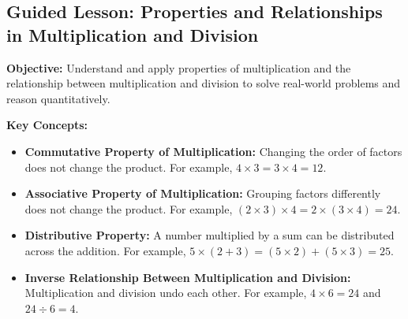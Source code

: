 \documentclass[11pt]{article}
\title{}
\date{}
\begin{document}
\subsection*{Guided Lesson: Properties and Relationships in Multiplication and Division}
\onehalfspacing

\begin{tcolorbox}[colframe=black!40, colback=gray!5, 
coltitle=black, colbacktitle=black!20, fonttitle=\bfseries\Large, 
title=Learning Objective, halign title=center, left=5pt, right=5pt, top=5pt, bottom=15pt]
\textbf{Objective:} Understand and apply properties of multiplication and the relationship between multiplication and division to solve real-world problems and reason quantitatively.
\end{tcolorbox}

\vspace{3em}

\begin{tcolorbox}[colframe=black!60, colback=white, 
coltitle=black, colbacktitle=black!15, fonttitle=\bfseries\Large, 
title=Key Concepts and Vocabulary, halign title=center, left=10pt, right=10pt, top=10pt, bottom=15pt]
\textbf{Key Concepts:}
\begin{itemize}
    \item \textbf{Commutative Property of Multiplication:} Changing the order of factors does not change the product. For example, \(4 \times 3 = 3 \times 4 = 12\).
    \item \textbf{Associative Property of Multiplication:} Grouping factors differently does not change the product. For example, \((2 \times 3) \times 4 = 2 \times (3 \times 4) = 24\).
    \item \textbf{Distributive Property:} A number multiplied by a sum can be distributed across the addition. For example, \(5 \times (2 + 3) = (5 \times 2) + (5 \times 3) = 25\).
    \item \textbf{Inverse Relationship Between Multiplication and Division:} Multiplication and division undo each other. For example, \(4 \times 6 = 24\) and \(24 \div 6 = 4\).
\end{itemize}
\end{tcolorbox}

\vspace{5em}
\end{document}
